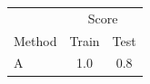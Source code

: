\begin{tabular}{lcc}
\toprule
 & \multicolumn{2}{c}{Score} \\
Method & Train & Test \\
\midrule
A & 1.0 & 0.8 \\
\bottomrule
\end{tabular}
